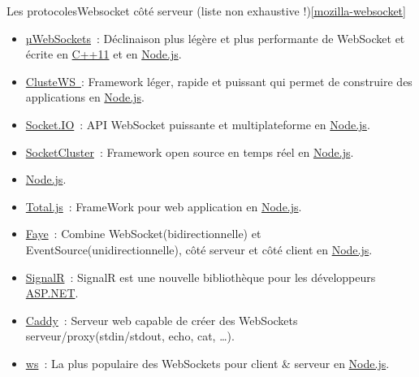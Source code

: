 \documentclass{beamer}
\begin{document}
    \begin{frame}{Les protocoles}{Websocket côté serveur (liste non exhaustive !)\cref{mozilla-websocket}}
        \begin{scriptsize}
            \begin{itemize}

                \item \href{https://github.com/uWebSockets/uWebSockets}{µWebSockets}~: Déclinaison plus légère et plus performante de WebSocket et écrite en \href{https://isocpp.org/}{C++11} et en \href{https://nodejs.org/fr/}{Node.js}.

                \item \href{https://github.com/ClusterWS/ClusterWS}{ClusteWS~}: Framework léger, rapide et puissant qui permet de construire des applications en \href{https://nodejs.org/fr/}{Node.js}.

                \item \href{http://socket.io}{Socket.IO}~: API WebSocket puissante et multiplateforme en \href{https://nodejs.org}{Node.js}.

                \item \href{https://socketcluster.io/\#!/}{SocketCluster}~: Framework open source en temps réel en \href{https://nodejs.org}{Node.js}.

                \item \href{https://nodejs.org}{Node.js}.

                \item \href{https://www.totaljs.com/}{Total.js}~: FrameWork pour web application en \href{https://nodejs.org}{Node.js}.

                \item \href{https://www.npmjs.com/package/faye-websocket}{Faye}~: Combine WebSocket(bidirectionnelle) et EventSource(unidirectionnelle), côté serveur et côté client en \href{https://nodejs.org}{Node.js}.

                \item \href{https://signalr.net/}{SignalR}~: SignalR est une nouvelle bibliothèque pour les développeurs \href{https://dotnet.microsoft.com/apps/aspnet}{ASP.NET}.

                \item \href{https://caddyserver.com/docs/websocket}{Caddy}~: Serveur web capable de créer des WebSockets serveur/proxy(stdin/stdout, echo, cat, \ldots).

                \item \href{https://github.com/websockets/ws}{ws}~: La plus populaire des WebSockets pour client \& serveur en \href{https://nodejs.org}{Node.js}.


\end{itemize}
\end{scriptsize}
\end{frame}
\end{document}
